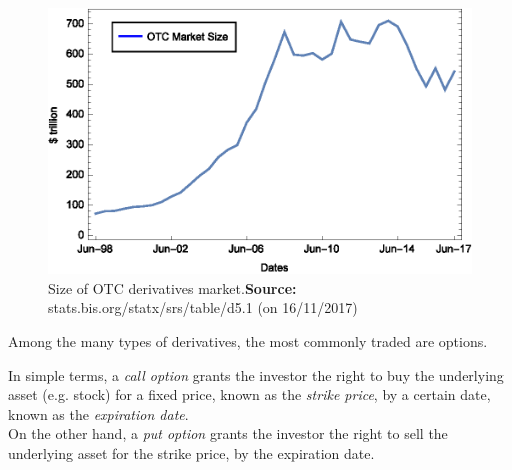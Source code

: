 \documentclass[a4paper,prd,twocolumn,nofootinbib,superscriptaddress,floatfix]{revtex4}
\begin{document}
\begin{figure}[H]
    \centering
      \includegraphics[width=1.0\columnwidth]{OTC.eps}
      \caption{Size of OTC derivatives market.\newline \footnotesize{\textbf{Source:} stats.bis.org/statx/srs/table/d5.1 (on 16/11/2017)}}\label{fig:OTC}
    \end{figure}


Among the many types of derivatives, the most commonly traded are options.

In simple terms, a \textit{call option} grants the investor the right to buy the underlying asset (e.g. stock) for a fixed price, known as the \textit{strike price}, by a certain date, known as the \textit{expiration date}.\\
On the other hand, a \textit{put option} grants the investor the right to sell the underlying asset for the strike price, by the expiration date.\\

\end{document}
